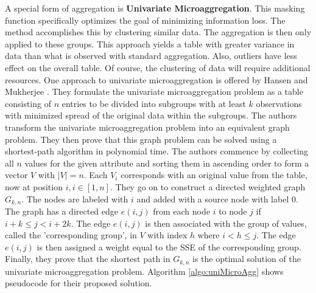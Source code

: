 A special form of aggregation is \textbf{Univariate Microaggregation\label{lit:univariate}}. This masking function specifically optimizes the goal of minimizing information loss. The method accomplishes this by clustering similar data. The aggregation is then only applied to these groups. This approach yields a table with greater variance in data than what is observed with standard aggregation. Also, outliers have less effect on the overall table. Of course, the clustering of data will require additional resources. One approach to univariate microaggregation is offered by Hansen and Mukherjee \cite{HansenUnivariateMicroaggregation}. They formulate the univariate microaggregation problem as a table consisting of $n$ entries to be divided into subgroups with at least $k$ observations with minimized spread of the original data within the subgroups. The authors transform the univariate microaggregation problem into an equivalent graph problem. They then prove that this graph problem can be solved using a shortest-path algorithm in polynomial time. The authors commence by collecting all $n$ values for the given attribute and sorting them in ascending order to form a vector $V$ with $|V| = n$. Each $V_i$ corresponds with an original value from the table, now at position $i, i \in [1,n]$. They go on to construct a directed weighted graph $G_{k,n}$. The nodes are labeled with $i$ and added with a source node with label $0$. The graph has a directed edge $e(i,j)$ from each node $i$ to node $j$ if $i + k \leq j < i + 2k$. The edge $e(i,j)$ is then associated with the group of values, called the 'corresponding group', in $V$ with index $h$ where $i < h \leq j$. The edge $e(i,j)$ is then assigned a weight equal to the \ac{SSE} of the corresponding group. Finally, they prove that the shortest path in $G_{k,n}$ is the optimal solution of the univariate microaggregation problem. Algorithm \ref{algo:uniMicroAgg} shows pseudocode for their proposed solution. 

